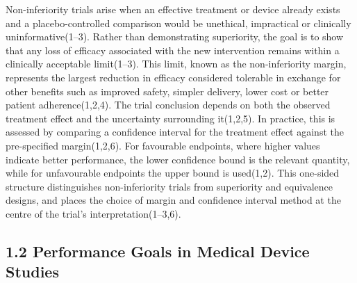 \documentclass{article}
\begin{document}
Non-inferiority trials arise when an effective treatment or device
already exists and a placebo-controlled comparison would be unethical,
impractical or clinically uninformative(1--3). Rather than demonstrating
superiority, the goal is to show that any loss of efficacy associated
with the new intervention remains within a clinically acceptable
limit(1--3). This limit, known as the non-inferiority margin, represents
the largest reduction in efficacy considered tolerable in exchange for
other benefits such as improved safety, simpler delivery, lower cost or
better patient adherence(1,2,4). The trial conclusion depends on both
the observed treatment effect and the uncertainty surrounding it(1,2,5).
In practice, this is assessed by comparing a confidence interval for the
treatment effect against the pre-specified margin(1,2,6). For favourable
endpoints, where higher values indicate better performance, the lower
confidence bound is the relevant quantity, while for unfavourable
endpoints the upper bound is used(1,2). This one-sided structure
distinguishes non-inferiority trials from superiority and equivalence
designs, and places the choice of margin and confidence interval method
at the centre of the trial's interpretation(1--3,6).

\subsection{1.2 Performance Goals in Medical Device
Studies}\label{performance-goals-in-medical-device-studies}
\end{document}
